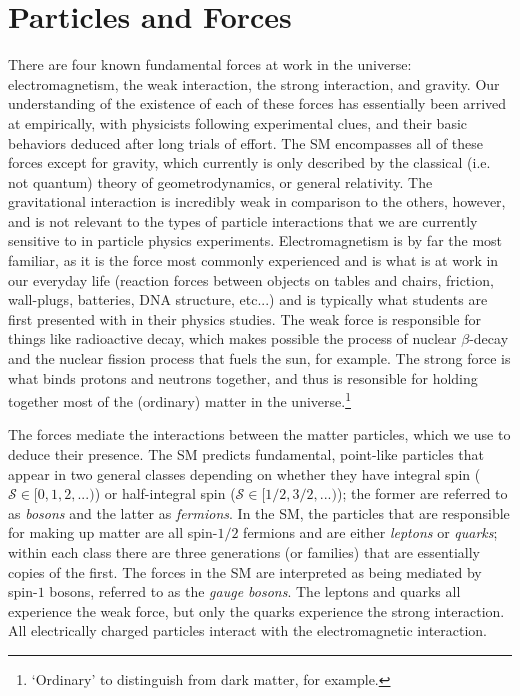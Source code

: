 \section{Particles and Forces}
\label{sec:sm_description}

There are four known fundamental forces at work in the universe: electromagnetism,
the weak interaction, the strong interaction, and gravity.
Our understanding of the existence of each of these forces
has essentially been arrived at empirically, with physicists following experimental
clues, and their basic behaviors deduced after long trials of effort.
The SM encompasses all of these forces except for gravity, which currently
is only described by the classical (i.e. not quantum) theory of geometrodynamics, or general
relativity.
The gravitational interaction is incredibly weak in comparison to the others, however, and
is not relevant to the types of particle interactions that we are currently
sensitive to in particle physics experiments.
Electromagnetism is by far the most familiar, as it is the force
most commonly experienced and is what is at work in our everyday life (reaction forces between
objects on tables and chairs, friction, wall-plugs, batteries, DNA structure, etc...) and is typically what
students are first presented with in their physics studies.
The weak force is responsible for things like radioactive decay,
which makes possible the process of nuclear $\beta$-decay and the nuclear
fission process that fuels the sun, for example. The strong force is what binds protons
and neutrons together, and thus is resonsible for holding together most of the (ordinary) matter
in the universe.\footnote{`Ordinary' to distinguish from dark matter, for example.}

The forces mediate the interactions between the matter particles, which we use to deduce
their presence. The SM predicts fundamental, point-like particles that appear in two
general classes depending on whether they have integral spin ($\mathcal{S} \in [0,1,2,...)$) or half-integral
spin ($\mathcal{S} \in [1/2, 3/2, ...)$); the former are referred to as \textit{bosons} and the
latter as \textit{fermions}.
In the SM, the particles that are responsible for making up matter are all spin-$1/2$ fermions
and are either \textit{leptons} or \textit{quarks}; within each class
there are three generations (or families) that are essentially copies of the first.
The forces in the SM are interpreted as being mediated by spin-$1$ bosons, referred to as the 
\textit{gauge bosons}.
The leptons and quarks all experience the weak force, but only the quarks experience
the strong interaction. All electrically charged particles interact with the electromagnetic
interaction.

